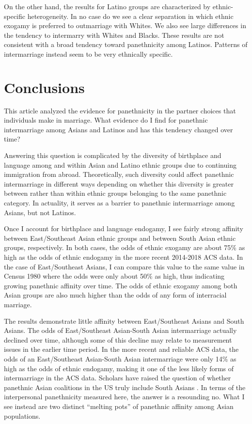 \documentclass[11pt,]{article}
\begin{document}
On the other hand, the results for Latino groups are characterized by ethnic-specific heterogeneity. In no case do we see a clear separation in which ethnic exogamy is preferred to outmarriage with Whites. We also see large differences in the tendency to intermarry with Whites and Blacks. These results are not consistent with a broad tendency toward panethnicity among Latinos. Patterns of intermarriage instead seem to be very ethnically specific.

\hypertarget{conclusions}{%
\section{Conclusions}\label{conclusions}}

This article analyzed the evidence for panethnicity in the partner choices that individuals make in marriage. What evidence do I find for panethnic intermarriage among Asians and Latinos and has this tendency changed over time?

Answering this question is complicated by the diversity of birthplace and language among and within Asian and Latino ethnic groups due to continuing immigration from abroad. Theoretically, such diversity could affect panethnic intermarriage in different ways depending on whether this diversity is greater between rather than within ethnic groups belonging to the same panethnic category. In actuality, it serves as a barrier to panethnic intermarriage among Asians, but not Latinos.

Once I account for birthplace and language endogamy, I see fairly strong affinity between East/Southeast Asian ethnic groups and between South Asian ethnic groups, respectively. In both cases, the odds of ethnic exogamy are about 75\% as high as the odds of ethnic endogamy in the more recent 2014-2018 ACS data. In the case of East/Southeast Asians, I can compare this value to the same value in Census 1980 where the odds were only about 50\% as high, thus indicating growing panethnic affinity over time. The odds of ethnic exogamy among both Asian groups are also much higher than the odds of any form of interracial marriage.

The results demonstrate little affinity between East/Southeast Asians and South Asians. The odds of East/Southeast Asian-South Asian intermarriage actually declined over time, although some of this decline may relate to measurement issues in the earlier time period. In the more recent and reliable ACS data, the odds of an East/Southeast Asian-South Asian intermarriage were only 14\% as high as the odds of ethnic endogamy, making it one of the less likely forms of intermarriage in the ACS data. Scholars have raised the question of whether panethnic Asian coalitions in the US truly include South Asians \citep{kibria_not_1996}. In terms of the interpersonal panethnicity measured here, the answer is a resounding no. What I see instead are two distinct ``melting pots'' of panethnic affinity among Asian populations.
\end{document}
